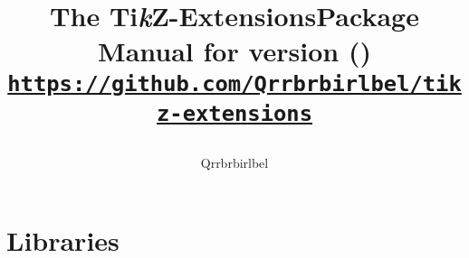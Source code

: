 %
%
%
\newcommand*\tikzextname{Ti\textit kZ-Extensions}
%

{%
\title{\bfseries The \tikzextname\space Package\\
  \large Manual for version \tikzextversion\space (\tikzextversionnumber)\\[1mm]
\large\href{https://github.com/Qrrbrbirlbel/tikz-extensions}
   {\texttt{https://github.com/Qrrbrbirlbel/tikz-extensions}}
\author{Qrrbrbirlbel}}

\maketitle
\label{table-of-contents}

\tableofcontents
}

%
\part{\tikzname\space Libraries}
\label{part:tikz}

